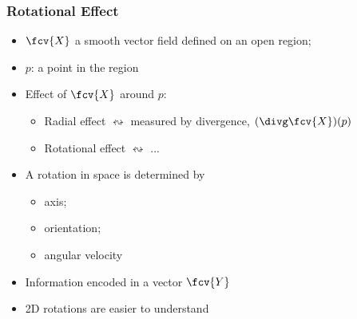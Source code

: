 \begin{frame}
  \frametitle{Rotational Effect}

  \begin{itemize}
    \item $\fcv{X}$ a smooth vector field defined on an open region;
    \item $p$: a point in the region
    \item Effect of $\fcv{X}$ around $p$:
    \begin{itemize}
      \item Radial effect $\leftrightsquigarrow$ measured by divergence,
      $(\divg \fcv{X})(p)$
      \item Rotational effect $\leftrightsquigarrow$ ...
    \end{itemize}
    \item \pause A rotation in space is determined by
    \begin{itemize}
      \item axis;
      \item orientation;
      \item angular velocity
    \end{itemize}
    \item \pause Information encoded in a vector $\fcv{Y}$
    \item \pause 2D rotations are easier to understand
  \end{itemize}


\end{frame}